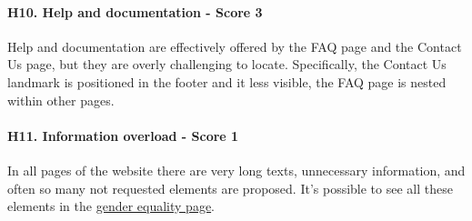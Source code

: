 \paragraph{H10. Help and documentation - Score 3}	Help and documentation are effectively offered by the FAQ page and the Contact Us page, but they are overly challenging to locate. Specifically, the Contact Us landmark is positioned in the footer and it less visible, the FAQ page is nested within other pages.
\newline
\paragraph{H11. Information overload - Score 1}	In all pages of the website there are very long texts, unnecessary information, and often so many not requested elements are proposed. It’s possible to see all these elements in the \href{https://www.unicef.org/gender-equality}{gender equality page}.
\newline
